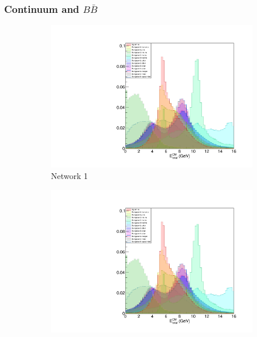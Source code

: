 \documentclass[12pt,a4paper]{article} %
\begin{document}
\subsubsection{Continuum and $B\bar{B}$}

    \begin{figure}
        \centering
        \begin{subfigure}[b]{0.475\textwidth}
            \centering
            \includegraphics[width=\textwidth]{images/test.pdf}
            \caption[Network2]%
            {{\small Network 1}}    
            \label{fig:mean and std of net14}
        \end{subfigure}
        \hfill
        \begin{subfigure}[b]{0.475\textwidth}  
            \centering 
            \includegraphics[width=\textwidth]{images/test.pdf}

\end{subfigure}
\end{figure}
\end{document}
